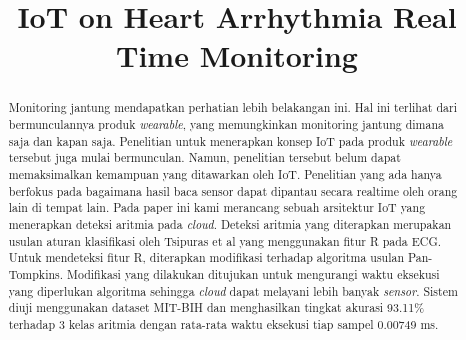 \documentclass[conference]{IEEEtran}
\begin{document}
\title{IoT on Heart Arrhythmia Real Time Monitoring\\
}

\author{
\and
{}
}

\maketitle

\begin{abstract}
Monitoring jantung mendapatkan perhatian lebih belakangan ini. Hal ini terlihat dari bermunculannya produk \textit{wearable}, yang memungkinkan monitoring jantung dimana saja dan kapan saja. Penelitian untuk menerapkan konsep IoT pada produk \textit{wearable} tersebut juga mulai bermunculan. Namun, penelitian tersebut belum dapat memaksimalkan kemampuan yang ditawarkan oleh IoT. Penelitian yang ada hanya berfokus pada bagaimana hasil baca sensor dapat dipantau secara realtime oleh orang lain di tempat lain. Pada paper ini kami merancang sebuah arsitektur IoT yang menerapkan deteksi aritmia pada \textit{cloud}. Deteksi aritmia yang diterapkan merupakan usulan aturan klasifikasi oleh Tsipuras et al yang menggunakan fitur R pada ECG. Untuk mendeteksi fitur R, diterapkan modifikasi terhadap algoritma usulan Pan-Tompkins. Modifikasi yang dilakukan ditujukan untuk mengurangi waktu eksekusi yang diperlukan algoritma sehingga \textit{cloud} dapat melayani lebih banyak \textit{sensor}.  Sistem diuji menggunakan dataset MIT-BIH dan menghasilkan tingkat akurasi 93.11\% terhadap 3 kelas aritmia dengan rata-rata waktu eksekusi tiap sampel 0.00749 ms.
\end{abstract}
\end{document}
